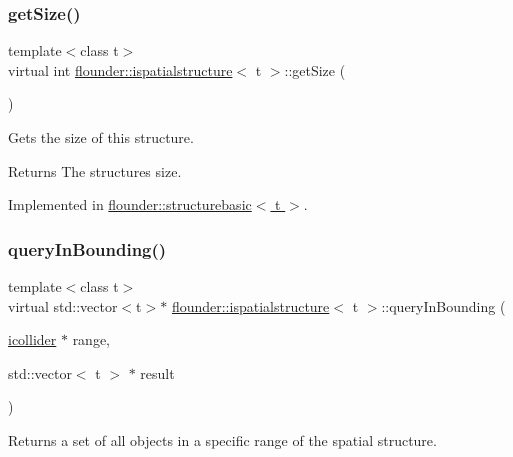 \subsubsection{\texorpdfstring{get\+Size()}{getSize()}}
{\footnotesize\ttfamily template$<$class t$>$ \\
virtual int \hyperlink{classflounder_1_1ispatialstructure}{flounder\+::ispatialstructure}$<$ t $>$\+::get\+Size (\begin{DoxyParamCaption}{ }\end{DoxyParamCaption})\hspace{0.3cm}{\ttfamily [pure virtual]}}



Gets the size of this structure. 

\begin{DoxyReturn}{Returns}
The structures size. 
\end{DoxyReturn}


Implemented in \hyperlink{classflounder_1_1structurebasic_aaef414a91ef6bd96982b1f7c10ae31b2}{flounder\+::structurebasic$<$ t $>$}.

\mbox{\label{classflounder_1_1ispatialstructure_abd5dd6c5d3ec13163b4edf70f083eb4c}} 
\subsubsection{\texorpdfstring{query\+In\+Bounding()}{queryInBounding()}}
{\footnotesize\ttfamily template$<$class t$>$ \\
virtual std\+::vector$<$t$>$$\ast$ \hyperlink{classflounder_1_1ispatialstructure}{flounder\+::ispatialstructure}$<$ t $>$\+::query\+In\+Bounding (\begin{DoxyParamCaption}\item[{\hyperlink{classflounder_1_1icollider}{icollider} $\ast$}]{range,  }\item[{std\+::vector$<$ t $>$ $\ast$}]{result }\end{DoxyParamCaption})\hspace{0.3cm}{\ttfamily [pure virtual]}}



Returns a set of all objects in a specific range of the spatial structure. 


